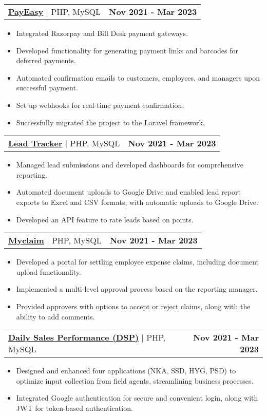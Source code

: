 \documentclass[letterpaper,11pt]{article}
\makeatletter
\newcommand{\resumeItem}[1]{
  \item\small{
    {#1 \vspace{-2pt}}
  }
}
\newcommand{\resumeProjectHeading}[2]{
    \item
    \begin{tabular*}{1.001\textwidth}{l@{\extracolsep{\fill}}r}
      \small#1 & \textbf{\small #2}\\
    \end{tabular*}\vspace{-7pt}
}
\newcommand{\resumeItemListStart}{\begin{itemize}}
\newcommand{\resumeItemListEnd}{\end{itemize}\vspace{-5pt}}
\makeatother
\begin{document}
      \resumeProjectHeading
          {{\textbf{\large{\underline{PayEasy}}} {\raisebox{-0.1\height}\faExternalLink }} $|$ \large{PHP, MySQL}}{Nov 2021 - Mar 2023}
          \resumeItemListStart
            \resumeItem{\normalsize{Integrated Razorpay and Bill Desk payment gateways.}}
            \resumeItem{\normalsize{Developed functionality for generating payment links and barcodes for deferred payments.}}
            \resumeItem{\normalsize{Automated confirmation emails to customers, employees, and managers upon successful payment.}}
            \resumeItem{\normalsize{Set up webhooks for real-time payment confirmation.}}
            \resumeItem{\normalsize{Successfully migrated the project to the Laravel framework.}}
          \resumeItemListEnd
          \vspace{-13pt}

      \resumeProjectHeading
          {{\textbf{\large{\underline{Lead Tracker}}} {\raisebox{-0.1\height}\faExternalLink }} $|$ \large{PHP, MySQL}}{Nov 2021 - Mar 2023}
          \resumeItemListStart
            \resumeItem{\normalsize{Managed lead submissions and developed dashboards for comprehensive reporting.}}
            \resumeItem{\normalsize{Automated document uploads to Google Drive and enabled lead report exports to Excel and CSV formats, with automatic uploads to Google Drive.}}
            \resumeItem{\normalsize{Developed an API feature to rate leads based on points.}}
          \resumeItemListEnd
          \vspace{-13pt}

      \resumeProjectHeading
          {{\textbf{\large{\underline{Myclaim}}} {\raisebox{-0.1\height}\faExternalLink }} $|$ \large{PHP, MySQL}}{Nov 2021 - Mar 2023}
          \resumeItemListStart
            \resumeItem{\normalsize{Developed a portal for settling employee expense claims, including document upload functionality.}}
            \resumeItem{\normalsize{Implemented a multi-level approval process based on the reporting manager.}}
            \resumeItem{\normalsize{Provided approvers with options to accept or reject claims, along with the ability to add comments.}}
          \resumeItemListEnd
          \vspace{-13pt}

      \resumeProjectHeading
          {{\textbf{\large{\underline{Daily Sales Performance (DSP)}}} {\raisebox{-0.1\height}\faExternalLink }} $|$ \large{PHP, MySQL}}{Nov 2021 - Mar 2023}
          \resumeItemListStart
            \resumeItem{\normalsize{Designed and enhanced four applications (NKA, SSD, HYG, PSD) to optimize input collection from field agents, streamlining business processes.}}
            \resumeItem{\normalsize{Integrated Google authentication for secure and convenient login, along with JWT for token-based authentication.}}
          \resumeItemListEnd
          \vspace{-13pt}
\end{document}
